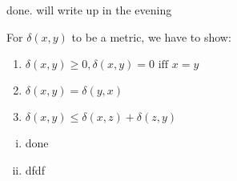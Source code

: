 \documentclass[10pt,a4paper,boxed]{hmcpset}
\begin{document}
		\begin{problem}[4. Distances]
		\end{problem}
		\begin{solution}
			done. will write up in the evening
	
			For $\delta(x,y)$ to be a metric, we have to show:
			\begin{enumerate}
				\item $\delta(x,y)\geq 0, \delta(x,y)=0 \mbox{ iff } x=y$
				\item $\delta(x,y)=\delta(y,x)$
				\item $\delta(x,y) \leq \delta(x,z)+\delta(z,y)$
			\end{enumerate}
	
			\begin{enumerate}[(i)]
				\item done
				\item dfdf		
			\end{enumerate}
		\end{solution}

	
\end{document}
